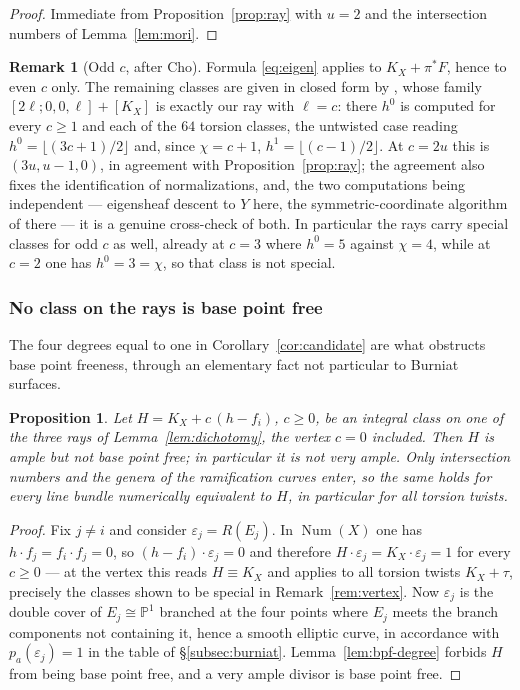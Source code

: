\documentclass{amsart}
\newtheorem{proposition}[theorem]{Proposition}
\theoremstyle{definition}
\newtheorem{remark}[theorem]{Remark}
\newcommand{\PP}{\mathbb{P}}
\newcommand{\Num}{\operatorname{Num}}
\begin{document}
\begin{proof}
Immediate from Proposition~\ref{prop:ray} with $u=2$ and the intersection numbers of Lemma~\ref{lem:mori}.
\end{proof}

\begin{remark}[Odd $c$, after Cho]\label{subsubsec:cho-rays}
Formula \eqref{eq:eigen} applies to $K_X+\pi^*F$, hence to even $c$ only. The remaining classes are given in closed form by \cite[Prop.~4.27]{Cho26}, whose family $[2\ell;0,0,\ell]+[K_X]$ is exactly our ray with $\ell=c$: there $h^0$ is computed for every $c\ge1$ and each of the $64$ torsion classes, the untwisted case reading $h^0=\lfloor(3c+1)/2\rfloor$ and, since $\chi=c+1$, $h^1=\lfloor(c-1)/2\rfloor$. At $c=2u$ this is $(3u,u-1,0)$, in agreement with Proposition~\ref{prop:ray}; the agreement also fixes the identification of normalizations, and, the two computations being independent --- eigensheaf descent to $Y$ here, the symmetric-coordinate algorithm of \cite{Cho26} there --- it is a genuine cross-check of both. In particular the rays carry special classes for odd $c$ as well, already at $c=3$ where $h^0=5$ against $\chi=4$, while at $c=2$ one has $h^0=3=\chi$, so that class is not special.
\end{remark}

\subsubsection{No class on the rays is base point free}
The four degrees equal to one in Corollary~\ref{cor:candidate} are what obstructs base point freeness, through an elementary fact not particular to Burniat surfaces.

\begin{proposition}\label{prop:notva}
Let $H=K_X+c\,(h-f_i)$, $c\ge0$, be an integral class on one of the three rays of Lemma~\ref{lem:dichotomy}, the vertex $c=0$ included. Then $H$ is ample but \emph{not} base point free; in particular it is not very ample. Only intersection numbers and the genera of the ramification curves enter, so the same holds for every line bundle numerically equivalent to $H$, in particular for all torsion twists.
\end{proposition}

\begin{proof}
Fix $j\neq i$ and consider $\varepsilon_j=R(E_j)$. In $\Num(X)$ one has $h\cdot f_j=f_i\cdot f_j=0$, so $(h-f_i)\cdot\varepsilon_j=0$ and therefore $H\cdot\varepsilon_j=K_X\cdot\varepsilon_j=1$ for every $c\ge0$ --- at the vertex this reads $H\equiv K_X$ and applies to all torsion twists $K_X+\tau$, precisely the classes shown to be special in Remark~\ref{rem:vertex}. Now $\varepsilon_j$ is the double cover of $E_j\cong\PP^1$ branched at the four points where $E_j$ meets the branch components not containing it, hence a smooth elliptic curve, in accordance with $p_a(\varepsilon_j)=1$ in the table of \S\ref{subsec:burniat}. Lemma~\ref{lem:bpf-degree} forbids $H$ from being base point free, and a very ample divisor is base point free.
\end{proof}
\end{document}
